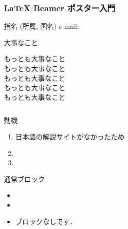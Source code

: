 \documentclass[final,hyperref={pdfpagelabels=false}]{beamer}
\begin{document}
  \begin{frame}[t]{} 
   \frametitle{\VERYHuge LaTeX Beamer ポスター入門}
\LARGE 指名
\large (所属, 国名)
\Large {\color{blue} e-mail: }
\LARGE
     \begin{alertblock}{\Huge 大事なこと}
      \begin{center}
        \VERYHuge もっとも大事なこと\\
        \VeryHuge もっとも大事なこと\\
        \veryHuge もっとも大事なこと\\
        \Huge もっとも大事なこと\\
        \huge もっとも大事なこと\\
        \vspace*{5cm}
      \end{center}
     \end{alertblock}

\normalsize  
  \begin{columns}[t]
    \begin{column}{.49\linewidth}
     \begin{exampleblock}{\LARGE 動機}
      \begin{enumerate}
        \item 日本語の解説サイトがなかったため
        \item
        \item 
      \end{enumerate}
        \vspace*{5cm}
     \end{exampleblock}

     \begin{block}{\LARGE 通常ブロック}
        \vspace*{5cm}
      \begin{itemize}
        \item 
        \item 
     \end{itemize}

     \end{block}



     \begin{itemize}
       \item ブロックなしです．
     \end{itemize}






\end{column}
\end{columns}
\end{frame}
\end{document}

